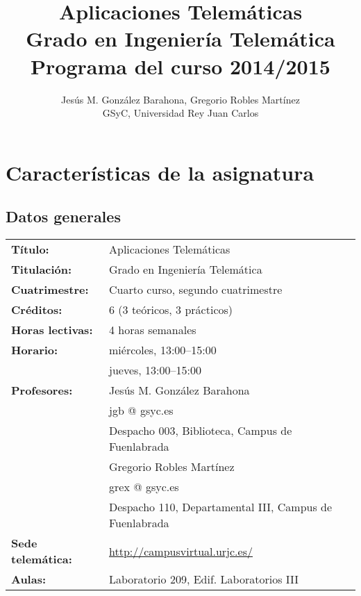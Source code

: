 \documentclass[a4paper,12pt]{report}
\title{Aplicaciones Telemáticas \\
Grado en Ingeniería Telemática \\
Programa del curso 2014/2015}
\author{Jesús M. González Barahona, Gregorio Robles Martínez \\
GSyC, Universidad Rey Juan Carlos}
\begin{document}
\maketitle

\tableofcontents

\newpage

\chapter{Características de la asignatura}

\section{Datos generales}

\begin{tabular}{ll}
\textbf{Título:} & Aplicaciones Telemáticas  \\
\textbf{Titulación:} & Grado en Ingeniería Telemática \\
\textbf{Cuatrimestre:} & Cuarto curso, segundo cuatrimestre \\
\textbf{Créditos:} & 6 (3 teóricos, 3 prácticos) \\
\textbf{Horas lectivas:} & 4 horas semanales \\
\textbf{Horario:} & miércoles, 13:00--15:00 \\
                  & jueves, 13:00--15:00 \\
\textbf{Profesores:}
& Jesús M. González Barahona \\
& \hspace{1cm}jgb @ gsyc.es \\
& \hspace{1cm}Despacho 003, Biblioteca, Campus de Fuenlabrada\\
& Gregorio Robles Martínez\\
& \hspace{1cm}grex @ gsyc.es \\
& \hspace{1cm}Despacho 110, Departamental III, Campus de Fuenlabrada\\
\textbf{Sede telemática:} & \url{http://campusvirtual.urjc.es/} \\
\textbf{Aulas:} & Laboratorio 209, Edif. Laboratorios III \\
\end{tabular}
\end{document}
